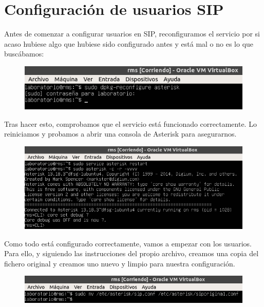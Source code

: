 \documentclass[11pt,a4paper]{article}
\begin{document}
\newpage

\section{Configuración de usuarios SIP}

Antes de comenzar a configurar usuarios en SIP, reconfiguramos el servicio por si acaso hubiese algo que hubiese sido configurado antes y está mal o no es lo que buscábamos:

\begin{figure}[H]
	\centering
	\includegraphics[scale=0.76]{img/1.png}
\end{figure}

Tras hacer esto, comprobamos que el servicio está funcionado correctamente. Lo reiniciamos y probamos a abrir una consola de Asterisk para asegurarnos.

\begin{figure}[H]
	\includegraphics[scale=0.61]{img/2.png}
\end{figure}

Como todo está configurado correctamente, vamos a empezar con los usuarios. Para ello, y siguiendo las instrucciones del propio archivo, creamos una copia del fichero original y creamos uno nuevo y limpio para nuestra configuración.

\begin{figure}[H]
	\centering
	\includegraphics[scale=0.62]{img/3.png}
\end{figure}
\end{document}
